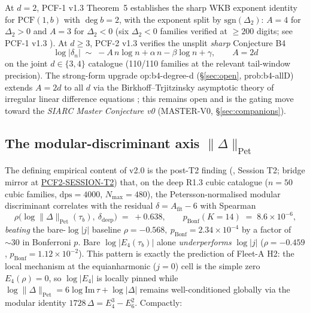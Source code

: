 \documentclass[11pt,a4paper]{article}
\theoremstyle{definition}
\theoremstyle{remark}
\newcommand{\PCF}{\mathrm{PCF}}
\newcommand{\PetN}[1]{\lVert #1 \rVert_{\mathrm{Pet}}}
\begin{document}
At $d=2$, PCF-1 v1.3 Theorem~5 establishes the sharp WKB exponent
identity for $\PCF(1,b)$ with $\deg b = 2$, with the exponent split by
$\mathrm{sgn}(\Delta_2)$: $A = 4$ for $\Delta_2 > 0$ and $A = 3$ for
$\Delta_2 < 0$ (six $\Delta_2 < 0$ families verified at $\geq 200$
digits; see PCF-1 v1.3 \cite{PCF1}). At $d \geq 3$, PCF-2 v1.3
\cite{PCF2} verifies the unsplit \emph{sharp} Conjecture B4
\begin{equation}
  \label{eq:b4-conjecture}
  \log|\delta_n| \;\sim\; -A\, n \log n + \alpha\, n - \beta \log n + \gamma,
  \qquad A = 2d
\end{equation}
on the joint $d \in \{3,4\}$ catalogue (110/110 families at the
relevant tail-window precision). The strong-form upgrade
\textsf{op:b4-degree-d} (\S\ref{sec:open}, \textsf{prob:b4-allD})
extends $A = 2d$ to all $d$ via the Birkhoff--Trjitzinsky
asymptotic theory of irregular linear difference equations
\cite{Birkhoff1930,BirkhoffTrjitzinsky1933}; this remains open and is
the gating move toward the \emph{SIARC Master Conjecture v0}
(MASTER-V0, \S\ref{sec:companions}).

\subsection{The modular-discriminant axis \texorpdfstring{$\PetN{\Delta}$}{Pet-norm Delta}}
\label{sec:triple-moddisc}

The defining empirical content of v2.0 is the post-T2 finding
(\cite{PCF2}, Session T2; bridge mirror at
\href{https://github.com/papanokechi/siarc-relay-bridge/tree/main/sessions/2026-05-02/PCF2-SESSION-T2/}{PCF2-SESSION-T2})
that, on the deep R1.3 cubic catalogue ($n=50$ cubic families,
$\mathrm{dps} = 4000$, $N_{\max} = 480$), the Petersson-normalised
modular discriminant correlates with the residual $\delta = A_{\mathrm{fit}} - 6$
with Spearman
\[
   \rho\bigl(\log \PetN{\Delta}(\tau_b),\ \delta_{\mathrm{deep}}\bigr)
       \;=\; +0.638,
   \qquad p_{\mathrm{Bonf}}(K{=}14) \;=\; 8.6 \times 10^{-6},
\]
\emph{beating} the bare-$\log|j|$ baseline
$\rho = -0.568,\ p_{\mathrm{Bonf}} = 2.34 \times 10^{-4}$ by a factor of
\(\sim 30\) in Bonferroni $p$. Bare $\log|E_4(\tau_b)|$ alone
\emph{underperforms} $\log|j|$ ($\rho = -0.459$,
$p_{\mathrm{Bonf}} = 1.12 \times 10^{-2}$). This pattern is exactly the
prediction of Fleet-A H2: the local mechanism at the equianharmonic
($j=0$) cell is the simple zero $E_4(\rho)=0$, so $\log|E_4|$ is locally
pinned while $\log\PetN{\Delta} = 6 \log\mathrm{Im}\,\tau + \log|\Delta|$
remains well-conditioned globally via the modular identity
$1728\,\Delta = E_4^3 - E_6^2$. Compactly:
\end{document}
